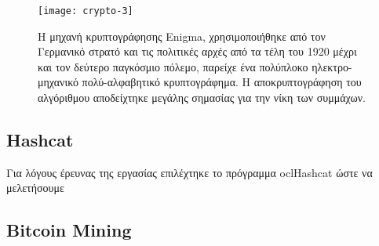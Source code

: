 \begin{figure}[h]
\centering
\texttt{[image: crypto-3]}
\caption{Η μηχανή κρυπτογράφησης Enigma, χρησιμοποιήθηκε από τον Γερμανικό στρατό και τις πολιτικές αρχές από τα τέλη του 1920 μέχρι και τον δεύτερο παγκόσμιο πόλεμο, παρείχε ένα πολύπλοκο ηλεκτρο-μηχανικό πολύ-αλφαβητικό κρυπτογράφημα. H αποκρυπτογράφηση του αλγόριθμου αποδείχτηκε μεγάλης σημασίας για την νίκη των συμμάχων.}
\end{figure}



\subsection{Hashcat}
Για λόγους έρευνας της εργασίας επιλέχτηκε το πρόγραμμα oclHashcat ώστε να μελετήσουμε 



\subsection{Bitcoin Mining}
